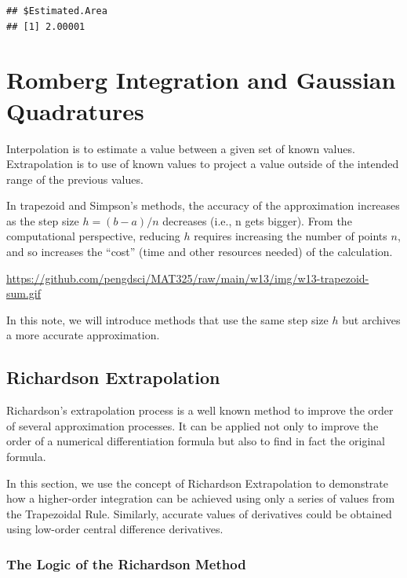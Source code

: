 \documentclass[
]{book}
\begin{document}
\begin{verbatim}
## $Estimated.Area
## [1] 2.00001
\end{verbatim}

\hypertarget{romberg-integration-and-gaussian-quadratures}{%
\chapter{Romberg Integration and Gaussian Quadratures}\label{romberg-integration-and-gaussian-quadratures}}

Interpolation is to estimate a value between a given set of known values. Extrapolation is to use of known values to project a value outside of the intended range of the previous values.

In trapezoid and Simpson's methods, the accuracy of the approximation increases as the step size \(h = (b-a)/n\) decreases (i.e., n gets bigger). From the computational perspective, reducing \(h\) requires increasing the number of points \(n\), and so increases the ``cost'' (time and other resources needed) of the calculation.

\url{https://github.com/pengdsci/MAT325/raw/main/w13/img/w13-trapezoid-sum.gif}

In this note, we will introduce methods that use the same step size \(h\) but archives a more accurate approximation.

\hfill\break

\hypertarget{richardson-extrapolation}{%
\section{Richardson Extrapolation}\label{richardson-extrapolation}}

Richardson's extrapolation process is a well known method to improve the order of several approximation processes. It can be applied not only to improve the order of a numerical differentiation formula but also to find in fact the original formula.

In this section, we use the concept of Richardson Extrapolation to demonstrate how a higher-order integration can be achieved using only a series of values from the Trapezoidal Rule. Similarly, accurate values of derivatives could be obtained using low-order central difference derivatives.

\hfill\break

\hypertarget{the-logic-of-the-richardson-method}{%
\subsection{The Logic of the Richardson Method}\label{the-logic-of-the-richardson-method}}
\end{document}
